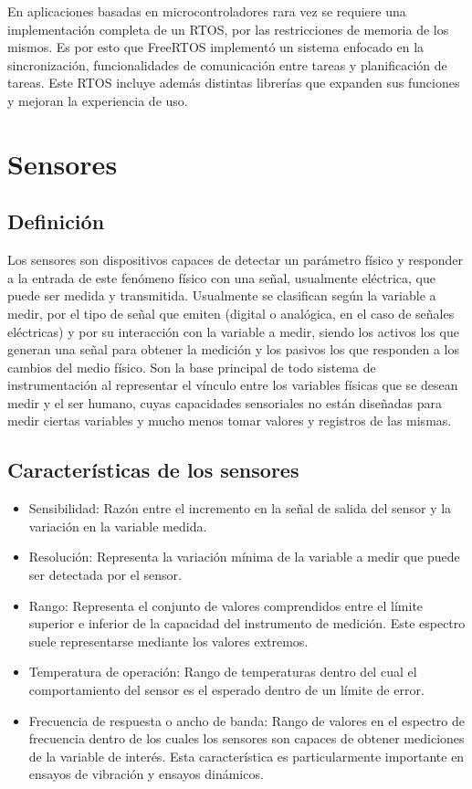 En aplicaciones basadas en microcontroladores rara vez se requiere una implementación completa de un RTOS, por las restricciones de memoria de los mismos. Es por esto que FreeRTOS implementó un sistema enfocado en la sincronización, funcionalidades de comunicación entre tareas y planificación de tareas. Este RTOS incluye además distintas librerías que expanden sus funciones y mejoran la experiencia de uso.



\section{Sensores}

\subsection{Definición}

Los sensores son dispositivos capaces de detectar un parámetro físico y responder a la entrada de este fenómeno físico con una señal, usualmente eléctrica, que puede ser medida y transmitida. Usualmente se clasifican según la variable a medir, por el tipo de señal que emiten (digital o analógica, en el caso de señales eléctricas) y por su interacción con la variable a medir, siendo los activos los que generan una señal para obtener la medición y los pasivos los que responden a los cambios del medio físico. Son la base principal de todo sistema de instrumentación al representar el vínculo entre los variables físicas que se desean medir y el ser humano, cuyas capacidades sensoriales no están diseñadas para medir ciertas variables y mucho menos tomar valores y registros de las mismas.


\subsection{Características de los sensores}

\begin{itemize}
    \item Sensibilidad: Razón entre el incremento en la señal de salida del sensor y la variación en la variable medida.
    \item Resolución: Representa la variación mínima de la variable a medir que puede ser detectada por el sensor.
    \item Rango: Representa el conjunto de valores comprendidos entre el límite superior e inferior de la capacidad del instrumento de medición. Este espectro suele representarse mediante los valores extremos.
    \item Temperatura de operación: Rango de temperaturas dentro del cual el comportamiento del sensor es el esperado dentro de un límite de error.
    \item Frecuencia de respuesta o ancho de banda: Rango de valores en el espectro de frecuencia dentro de los cuales los sensores son capaces de obtener mediciones de la variable de interés. Esta característica es particularmente importante en ensayos de vibración y ensayos dinámicos.
\end{itemize}

